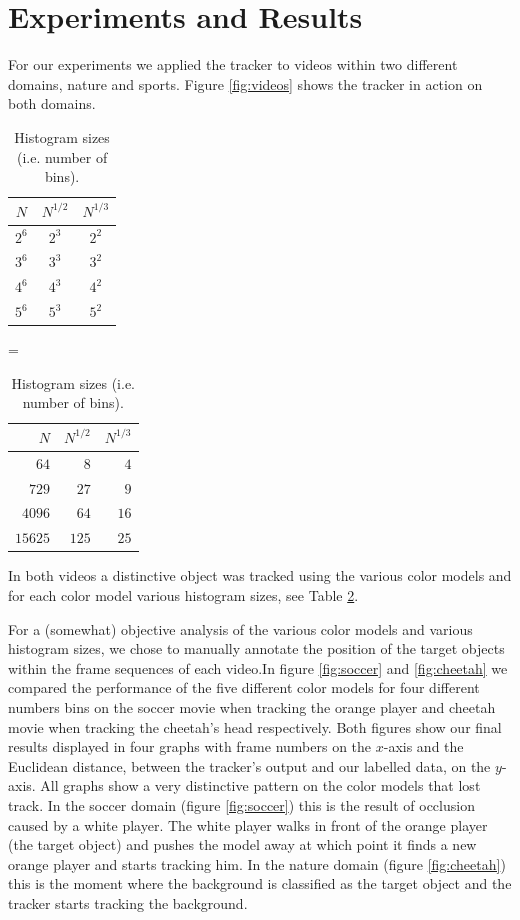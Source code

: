 \documentclass[11pt]{article}
\begin{document}
\section{Experiments and Results} \label{sec:results}
For our experiments we applied the tracker to videos within two different
domains, nature and sports. Figure \ref{fig:videos} shows the tracker in action
on both domains. 
\begin{table}
\centering
\begin{tabular}{c|c|c}
$N$   & $N^{1/2}$ & $N^{1/3}$\\\hline\hline
$2^6$ & $2^3$     & $2^2$\\\hline
$3^6$ & $3^3$     & $3^2$\\\hline
$4^6$ & $4^3$     & $4^2$\\\hline
$5^6$ & $5^3$     & $5^2$\\
\end{tabular}
=
\begin{tabular}{r|r|r}
$N$     & $N^{1/2}$ & $N^{1/3}$\\\hline\hline
$64$    & $8$       & $4$\\\hline
$729$   & $27$      & $9$\\\hline
$4096$  & $64$      & $16$\\\hline
$15625$ & $125$     & $25$\\
\end{tabular}
\caption{Histogram sizes (i.e. number of bins).}
\label{tbl:bins}
\end{table}
In both videos a distinctive object was tracked using the various color models
and for each color model various histogram sizes, see Table \ref{tbl:bins}.

For a (somewhat) objective analysis of the various color models and various
histogram sizes, we chose to manually annotate the position of the target
objects within the frame sequences of each video.In figure \ref{fig:soccer}
and \ref{fig:cheetah} we compared the performance of
the five different color models for four different numbers bins on the soccer
movie when tracking the orange player and cheetah movie when tracking the
cheetah's head respectively. Both figures show our final results displayed in
four graphs with frame numbers on the $x$-axis and the Euclidean distance,
between the tracker's output and our labelled data, on the $y$-axis. All graphs
show a very distinctive pattern on the color models that lost track. In the
soccer domain (figure \ref{fig:soccer}) this is the result of occlusion caused by
a white player. The white player walks in front of the orange player (the
target object) and pushes the model away at which point it finds a new orange
player and starts tracking him. In the nature domain (figure \ref{fig:cheetah})
this is the moment where the background is classified as the target object and
the tracker starts tracking the background.
\end{document}
